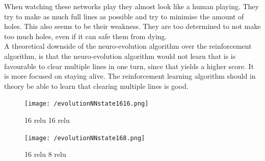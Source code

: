 \documentclass{report}
\begin{document}
When watching these networks play they almost look like a human playing. They try to make as much full lines as possible and try to minimise the amount of holes. This also seems to be their weakness. They are too determined to not make too much holes, even if it can safe them from dying.\\
A theoretical downside of the neuro-evolution algorithm over the reinforcement algorithm, is that the neuro-evolution algorithm would not learn that is is favourable to clear multiple lines in one turn, since that yields a higher score. It is more focused on staying alive. The reinforcement learning algorithm should in theory be able to learn that clearing multiple lines is good. 
\begin{figure}[h]
	\centering
	\begin{minipage}[b]{0.45\textwidth}
   		\texttt{[image: /evolutionNNstate1616.png]}
    	\caption{16 relu 16 relu}
    	\label{fig:evo1}
 	\end{minipage}
  	\begin{minipage}[b]{0.45\textwidth}
    	\texttt{[image: /evolutionNNstate168.png]}
    	\caption{16 relu 8 relu}
    	\label{fig:evo2}
 	\end{minipage}
\end{figure}


\printbibliography[heading=bibintoc,title={References}]
\end{document}

